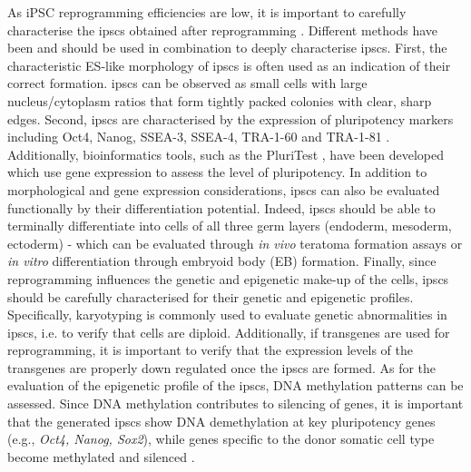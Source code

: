 As iPSC reprogramming efficiencies are low, it is important to carefully characterise the \glspl{ipsc} obtained after reprogramming \cite{brouwer2016choices}.
Different methods have been and should be used in combination to deeply characterise \glspl{ipsc}. 
First, the characteristic ES-like morphology of \glspl{ipsc} is often used as an indication of their correct formation. 
\glspl{ipsc} can be observed as small cells with large nucleus/cytoplasm ratios that form tightly packed colonies with clear, sharp edges. 
Second, \glspl{ipsc} are characterised by the expression of pluripotency markers including Oct4, Nanog, SSEA-3, SSEA-4, TRA-1-60 and TRA-1-81 \cite{boulting2011functionally}.
Additionally, bioinformatics tools, such as the PluriTest \cite{muller2011bioinformatic}, have been developed which use gene expression to assess the level of pluripotency. 
In addition to morphological and gene expression considerations, \glspl{ipsc} can also be evaluated functionally by their differentiation potential.
Indeed, \glspl{ipsc} should be able to terminally differentiate into cells of all three germ layers (endoderm, mesoderm, ectoderm) - which can be evaluated through \textit{in vivo} teratoma formation assays or \textit{in vitro} differentiation through embryoid body (EB) formation.
Finally, since reprogramming influences the genetic and epigenetic make-up of the cells, \glspl{ipsc} should be carefully characterised for their genetic and epigenetic profiles.
Specifically, karyotyping is commonly used to evaluate genetic abnormalities in \glspl{ipsc}, i.e. to verify that cells are diploid. 
Additionally, if transgenes are used for reprogramming, it is important to verify that the expression levels of the transgenes are properly down regulated once the \glspl{ipsc} are formed. 
As for the evaluation of the epigenetic profile of the \glspl{ipsc}, DNA methylation patterns can be assessed. 
Since DNA methylation contributes to silencing of genes, it is important that the generated \glspl{ipsc} show DNA demethylation at key pluripotency genes (e.g., \textit{Oct4, Nanog, Sox2}), while genes specific to the donor somatic cell type become methylated and silenced \cite{brouwer2016choices, omole2018ten}. 


